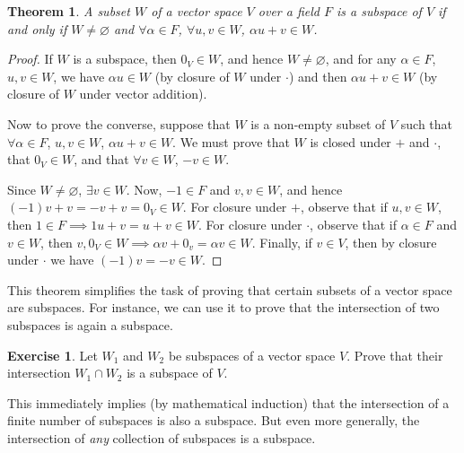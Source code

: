 \documentclass[svgnames]{article}
\newtheorem{Theorem}{Theorem}[section]
\theoremstyle{definition}
\newtheorem{Exercise}{Exercise}[section]
\theoremstyle{remark}
\begin{document}
\begin{Theorem}\label{thm:Subspace}
A subset $W$ of a vector space $V$ over a field $F$ is a subspace of $V$ if and only if $W \ne \varnothing$ and $\forall \alpha \in F$, $\forall u, v \in W$, $\alpha u + v \in W$.
\end{Theorem}
\begin{proof}
If $W$ is a subspace, then $0_V \in W$, and hence $W \ne \varnothing$, and for any $\alpha \in F$, $u, v \in W$, we have $\alpha u \in W$ (by closure of $W$ under $\cdot$) and then $\alpha u + v \in W$ (by closure of $W$ under vector addition).

Now to prove the converse, suppose that $W$ is a non-empty subset of $V$ such that $\forall \alpha \in F$, $u, v \in W$, $\alpha u + v \in W$. We must prove that $W$ is closed under $+$ and $\cdot$, that $0_V \in W$, and that $\forall v \in W$, $-v \in W$.

Since $W \ne \varnothing$, $\exists v \in W$. Now, $-1 \in F$ and $v, v \in W$, and hence $(-1)v + v = -v + v = 0_V \in W$. For closure under $+$, observe that if $u, v \in W$, then $1 \in F \implies 1u + v = u + v \in W$. For closure under $\cdot$, observe that if $\alpha \in F$ and $v \in W$, then $v, 0_V \in W \implies \alpha v + 0_v = \alpha v \in W$. Finally, if $v \in V$, then by closure under $\cdot$ we have $(-1)v = -v \in W$.
\end{proof}

This theorem simplifies the task of proving that certain subsets of a vector space are subspaces. For instance, we can use it to prove that the intersection of two subspaces is again a subspace.
\begin{Exercise}
Let $W_1$ and $W_2$ be subspaces of a vector space $V$. Prove that their intersection $W_1 \cap W_2$ is a subspace of $V$.
\end{Exercise}
This immediately implies (by mathematical induction) that the intersection of a finite number of subspaces is also a subspace. But even more generally, the intersection of \emph{any} collection of subspaces is a subspace.
\end{document}
